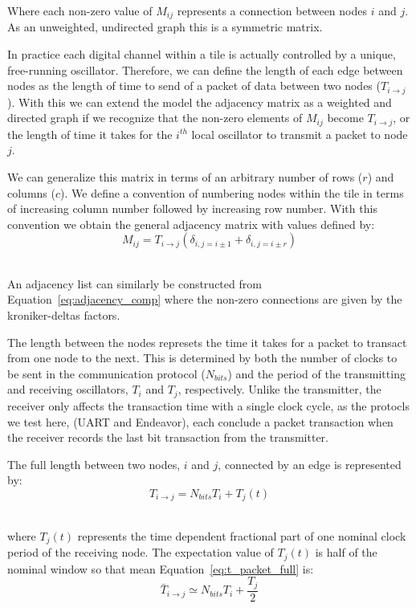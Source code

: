 Where each non-zero value of $M_{ij}$ represents a connection between nodes $i$ and $j$.
As an unweighted, undirected graph this is a symmetric matrix.

In practice each digital channel within a tile is actually controlled by a unique, free-running oscillator.
Therefore, we can define the length of each edge between nodes as the length of time to send of a packet of data between two nodes ($T_{i\rightarrow j}$).
With this we can extend the model the adjacency matrix as a weighted and directed graph if we recognize that the non-zero elements of $M_{ij}$ become $T_{i\rightarrow j}$, or the length of time it takes for the $i^{th}$ local oscillator to transmit a packet to node $j$.

We can generalize this matrix in terms of an arbitrary number of rows ($r$) and columns ($c$).
We define a convention of numbering nodes within the tile in terms of increasing column number followed by increasing row number.
With this convention we obtain the general adjacency matrix with values defined by:
\begin{equation}
  M_{ij} = T_{i\rightarrow j}(\delta_{i,j=i\pm 1} + \delta_{i,j=i\pm r})
\end{equation}~\label{eq:adjacency_comp}

An adjacency list can similarly be constructed from Equation~\ref{eq:adjacency_comp} where the non-zero connections are given by the kroniker-deltas factors.

The length between the nodes represets the time it takes for a packet to transact from one node to the next.
This is determined by both the number of clocks to be sent in the communication protocol ($N_{bits}$) and the period of the transmitting and receiving oscillators, $T_{i}$ and $T_{j}$, respectively.
Unlike the transmitter, the receiver only affects the transaction time with a single clock cycle, as the protocls we test here, (UART and Endeavor), each conclude a packet transaction when the receiver records the last bit transaction from the transmitter.

The full length between two nodes, $i$ and $j$, connected by an edge is represented by:
\begin{equation}
T_{i\rightarrow j} = N_{bits}T_{i} + T_{j}(t)
\end{equation}~\label{eq:t_packet_full}

where $T_{j}(t)$ represents the time dependent fractional part of one nominal clock period of the receiving node.
The expectation value of $T_{j}(t)$ is half of the nominal window so that mean Equation~\ref{eq:t_packet_full} is:
\begin{equation}
\bar{T}_{i\rightarrow j} \simeq N_{bits}T_{i} + \frac{T_{j}}{2}
\end{equation}~\label{eq:t_packet_avg}

